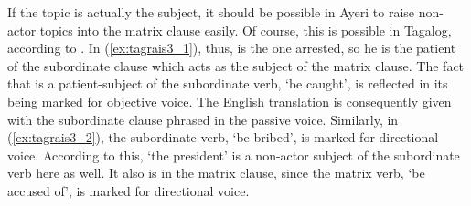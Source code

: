 If the topic is actually the subject, it should be possible in Ayeri to raise
non-actor topics into the matrix clause easily. Of course, this is possible in
Tagalog, according to \citet{kroeger1991}. In (\ref{ex:tagrais3_1}), thus,  is the one arrested, so he
is the patient of the subordinate clause which acts as the subject of the
matrix clause. The fact that  is a patient-subject of the
subordinate verb,  `be caught', is reflected in its being marked
for objective voice. The English translation is consequently given with the
subordinate clause phrased in the passive voice. Similarly, in
(\ref{ex:tagrais3_2}), the subordinate verb,  `be bribed', is
marked for directional voice. According to this,  `the
president' is a non-actor subject of the subordinate verb here as well. It also
is in the matrix clause, since the matrix verb,  `be accused
of', is marked for directional voice.

